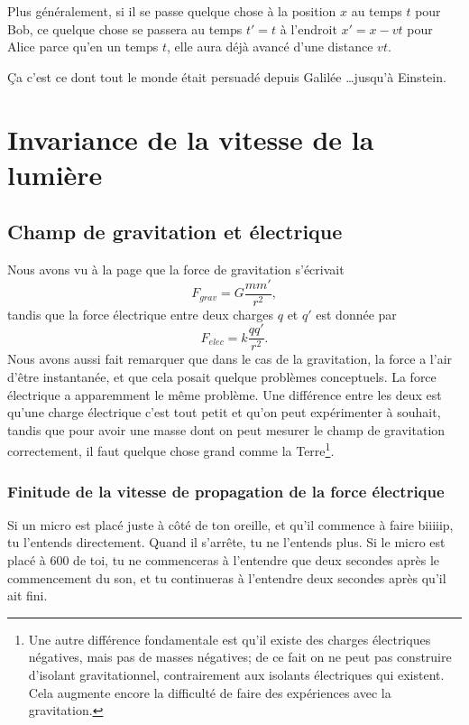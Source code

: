 \documentclass[a4paper,12pt]{book}
\theoremstyle{mes_exemples}	\newtheorem{exemple}[numtho]{Exemple}
\theoremstyle{mes_tho}
\begin{document}
Plus généralement, si il se passe quelque chose à la position $x$ au temps $t$ pour Bob, ce quelque chose se passera au temps $t'=t$ à l'endroit $x'=x-vt$ pour Alice parce qu'en un temps $t$, elle aura déjà avancé d'une distance $vt$.

Ça c'est ce dont tout le monde était persuadé depuis Galilée \ldots jusqu'à Einstein.

%
   \section{Invariance de la vitesse de la lumière}
%



\subsection{Champ de gravitation et électrique}

Nous avons vu à la page \pageref{PgForceGrav} que la force de gravitation s'écrivait 
\[ 
  F_{grav}=G\frac{ mm' }{ r^2 },
\]
tandis que la force électrique entre deux charges $q$ et $q'$ est donnée par
\begin{equation}	\label{EqRappelFelec}
  F_{elec}=k\frac{ qq' }{ r^2 }.
\end{equation}
Nous avons aussi fait remarquer que dans le cas de la gravitation, la force a l'air d'être instantanée, et que cela posait quelque problèmes conceptuels. La force électrique a apparemment le même problème. Une différence entre les deux est qu'une charge électrique c'est tout petit et qu'on peut expérimenter à souhait, tandis que pour avoir une masse dont on peut mesurer le champ de gravitation correctement, il faut quelque chose grand comme la Terre\footnote{Une autre différence fondamentale est qu'il existe des charges électriques négatives, mais pas de masses négatives; de ce fait on ne peut pas construire d'isolant gravitationnel, contrairement aux isolants électriques qui existent. Cela augmente encore la difficulté de faire des expériences avec la gravitation.}.

\subsubsection{Finitude de la vitesse de propagation de la force électrique}

Si un micro est placé juste à côté de ton oreille, et qu'il commence à faire biiiiip, tu l'entends directement. Quand il s'arrête, tu ne l'entends plus. Si le micro est placé à \unit{600}{\meter} de toi, tu ne commenceras à l'entendre que deux secondes après le commencement du son, et tu continueras à l'entendre deux secondes après qu'il ait fini.
\end{document}
